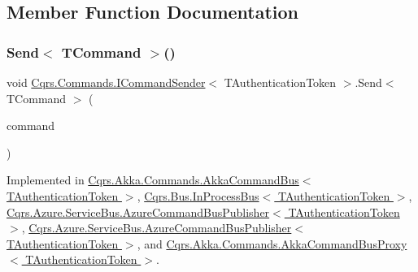 \subsection{Member Function Documentation}
\mbox{\label{interfaceCqrs_1_1Commands_1_1ICommandSender_a551d69f8679399fc0ce0fd99dead507a_a551d69f8679399fc0ce0fd99dead507a}} 
\subsubsection{\texorpdfstring{Send$<$ T\+Command $>$()}{Send< TCommand >()}\hspace{0.1cm}{\footnotesize\ttfamily [1/2]}}
{\footnotesize\ttfamily void \hyperlink{interfaceCqrs_1_1Commands_1_1ICommandSender}{Cqrs.\+Commands.\+I\+Command\+Sender}$<$ T\+Authentication\+Token $>$.Send$<$ T\+Command $>$ (\begin{DoxyParamCaption}\item[{T\+Command}]{command }\end{DoxyParamCaption})}



Implemented in \hyperlink{classCqrs_1_1Akka_1_1Commands_1_1AkkaCommandBus_a696f471533265685f80922e39727288e_a696f471533265685f80922e39727288e}{Cqrs.\+Akka.\+Commands.\+Akka\+Command\+Bus$<$ T\+Authentication\+Token $>$}, \hyperlink{classCqrs_1_1Bus_1_1InProcessBus_a6a074ef3663d2855875307b106fe4416_a6a074ef3663d2855875307b106fe4416}{Cqrs.\+Bus.\+In\+Process\+Bus$<$ T\+Authentication\+Token $>$}, \hyperlink{classCqrs_1_1Azure_1_1ServiceBus_1_1AzureCommandBusPublisher_ad4bbbadcac7eb6a83e47649979bc2e7f_ad4bbbadcac7eb6a83e47649979bc2e7f}{Cqrs.\+Azure.\+Service\+Bus.\+Azure\+Command\+Bus\+Publisher$<$ T\+Authentication\+Token $>$}, \hyperlink{classCqrs_1_1Azure_1_1ServiceBus_1_1AzureCommandBusPublisher_ad4bbbadcac7eb6a83e47649979bc2e7f_ad4bbbadcac7eb6a83e47649979bc2e7f}{Cqrs.\+Azure.\+Service\+Bus.\+Azure\+Command\+Bus\+Publisher$<$ T\+Authentication\+Token $>$}, and \hyperlink{classCqrs_1_1Akka_1_1Commands_1_1AkkaCommandBusProxy_a15945f41b7439e722f5608f48b63c6d9_a15945f41b7439e722f5608f48b63c6d9}{Cqrs.\+Akka.\+Commands.\+Akka\+Command\+Bus\+Proxy$<$ T\+Authentication\+Token $>$}.

